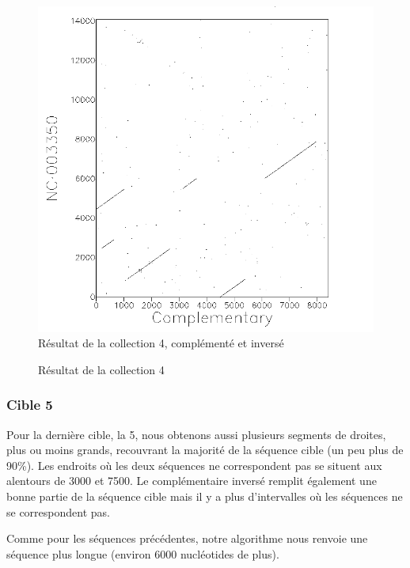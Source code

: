 \begin{figure}[!ht]
\begin{minipage}[c]{.46 \linewidth}
\begin{center}
			\includegraphics[scale= 0.4]{../res/cible4-ic.png}
			Résultat de la collection 4, complémenté et inversé
		\end{center}
	\end{minipage}
	\caption{Résultat de la collection 4}
\end{figure}

\FloatBarrier

\subsubsection*{Cible 5}

Pour la dernière cible, la 5, nous obtenons aussi plusieurs segments de droites,
plus ou moins grands, recouvrant la majorité de la séquence cible (un peu plus
de 90\%). Les endroits où les deux séquences ne correspondent pas se situent aux
alentours de 3000 et 7500. Le complémentaire inversé remplit également une bonne
partie de la séquence cible mais il y a plus d'intervalles où les séquences ne
se correspondent pas.

Comme pour les séquences précédentes, notre algorithme nous renvoie une séquence
plus longue (environ 6000 nucléotides de plus).

